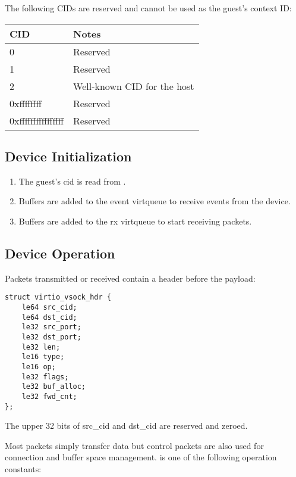 The following CIDs are reserved and cannot be used as the guest's context ID:

\begin{tabular}{|l|l|}
\hline
CID    & Notes \\
\hline \hline
0                 & Reserved \\
\hline
1                 & Reserved \\
\hline
2                 & Well-known CID for the host \\
\hline
0xffffffff        & Reserved \\
\hline
0xffffffffffffffff        & Reserved \\
\hline
\end{tabular}

\subsection{Device Initialization}\label{sec:Device Types / Socket Device / Device Initialization}

\begin{enumerate}
\item The guest's cid is read from .

\item Buffers are added to the event virtqueue to receive events from the device.

\item Buffers are added to the rx virtqueue to start receiving packets.
\end{enumerate}

\subsection{Device Operation}\label{sec:Device Types / Socket Device / Device Operation}

Packets transmitted or received contain a header before the payload:

\begin{lstlisting}
struct virtio_vsock_hdr {
	le64 src_cid;
	le64 dst_cid;
	le32 src_port;
	le32 dst_port;
	le32 len;
	le16 type;
	le16 op;
	le32 flags;
	le32 buf_alloc;
	le32 fwd_cnt;
};
\end{lstlisting}

The upper 32 bits of src_cid and dst_cid are reserved and zeroed.

Most packets simply transfer data but control packets are also used for
connection and buffer space management.   is one of the following
operation constants:

